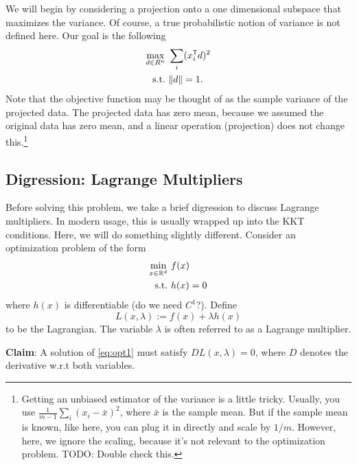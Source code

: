 We will begin by considering a projection onto a one dimensional subspace that maximizes the variance. Of course, a true probabilistic notion of variance is not defined here. Our goal is the following
\begin{align} \label{maxvar_opt_prob}
\max_{d\in R^n} ~& \sum_i (x_i^\T d)^2\\
\mbox{s.t.}~ & \|d\| = 1.
\end{align}
Note that the objective function may be thought of as the sample variance of the projected data. The projected data has zero mean, because we assumed the original data has zero mean, and a linear operation (projection) does not change this.\footnote{Getting an unbiased estimator of the variance is a little tricky. Usually, you use $\frac{1}{m-1}\sum_i (x_i - \bar x)^2$, where $\bar x$ is the sample mean. But if the sample mean is known, like here, you can plug it in directly and scale by $1/m$. However, here, we ignore the scaling, because it's not relevant to the optimization problem. TODO: Double check this.}


\subsection{Digression: Lagrange Multipliers}
Before solving this problem, we take a brief digression to discuss Lagrange multipliers.
In modern usage, this is usually wrapped up into the KKT conditions. Here, we will do something slightly different. 
Consider an optimization problem of the form
\begin{align} \label{eq:opt1}
\min_{x\in \mathbb{R}^d}~   & f(x)\\
\mbox{s.t.} ~ & h(x) = 0
\end{align}
where $h(x)$ is differentiable (do we need $C^1$?). 
Define 
$$
L(x, \lambda) := f(x) + \lambda h(x)
$$
to be the Lagrangian. The variable $\lambda$ is often referred to as a Lagrange multiplier. 

\textbf{Claim}: A solution of \eqref{eq:opt1} must satisfy $D L(x,\lambda) = 0$, where $D$ denotes the derivative w.r.t both variables.

